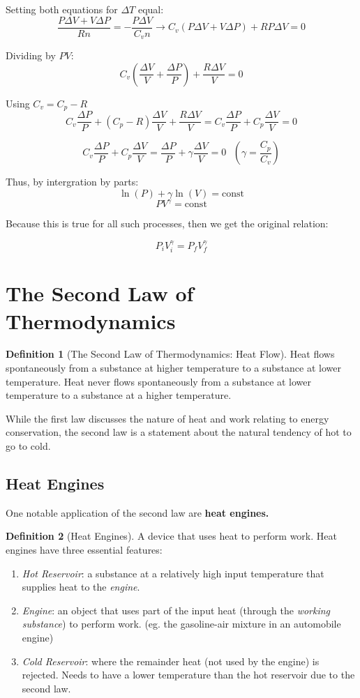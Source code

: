 \documentclass[12pt, a4paper]{article}
\theoremstyle{definition}
\newtheorem{definition}{Definition}
\begin{document}
Setting both equations for $\Delta T$ equal:
\[\frac{P\Delta V + V \Delta P}{Rn} = -\frac{P \Delta V}{C_v n} \rightarrow C_v (P\Delta V + V\Delta P) + RP \Delta V = 0\]

Dividing by $PV$:
\[C_v (\frac{\Delta V}{V} + \frac{\Delta P}{P}) + \frac{R\Delta V}{V} = 0\]

Using $C_v = C_p - R$
\[C_v \frac{\Delta P}{P} + (C_p - R)\frac{\Delta V}{V} + \frac{R\Delta V}{V} = C_v \frac{\Delta P}{P} + C_p \frac{\Delta V}{V} = 0\]

\[C_v \frac{\Delta P}{P} + C_p \frac{\Delta V}{V} = \frac{\Delta P}{P} + \gamma \frac{\Delta V}{V} = 0 \textrm{ } (\gamma = \frac{C_p}{C_v})\] %

Thus, by intergration by parts:
\[\ln(P) + \gamma \ln(V) = \textrm{const}\]
\[PV^{\gamma} = \textrm{const}\]

Because this is true for all such processes, then we get the original relation:

\[P_i V_i^\gamma = P_f V_f^\gamma\]

\section{The Second Law of Thermodynamics}
\begin{definition}[The Second Law of Thermodynamics: Heat Flow]
    Heat flows spontaneously from a substance at higher temperature to a substance at lower temperature.
    Heat never flows spontaneously from a substance at lower temperature to a substance at a higher temperature.
\end{definition}

While the first law discusses the nature of heat and work relating to energy conservation, the second law is a statement about the natural tendency of hot to go to cold.

\subsection{Heat Engines}

One notable application of the second law are \textbf{heat engines.}
\begin{definition}[Heat Engines]
    A device that uses heat to perform work.
    Heat engines have three essential features:
    \begin{enumerate}
        \item \textit{Hot Reservoir}: a substance at a relatively high input temperature that supplies heat to the \textit{engine}.
        \item \textit{Engine}: an object that uses part of the input heat (through the \textit{working substance}) to perform work. (eg. the gasoline-air mixture in an automobile engine)
        \item \textit{Cold Reservoir}: where the remainder heat (not used by the engine) is rejected. Needs to have a lower temperature than the hot reservoir due to the second law.
    \end{enumerate}
\end{definition}
\end{document}
